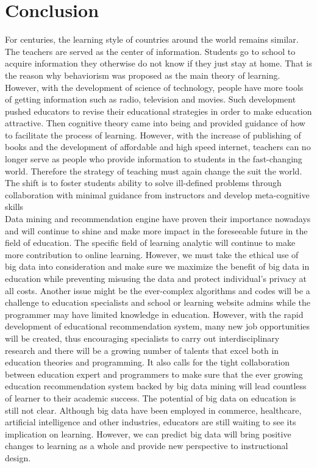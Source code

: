 \documentclass[sigconf]{acmart}
\begin{document}
\section{Conclusion}
For centuries, the learning style of countries around the world remains similar. The teachers are served as the center of information. Students go to school to acquire information they otherwise do not know if they just stay at home. That is the reason why behaviorism was proposed as the main theory of learning. However, with the development of science of technology, people have more tools of getting information such as radio, television and movies. Such development pushed educators to revise their educational strategies in order to make education attractive. Then cognitive theory came into being and provided guidance of how to facilitate the process of learning. However, with the increase of publishing of books and the development of affordable and high speed internet, teachers can no longer serve as people who provide information to students in the fast-changing world. Therefore the strategy of teaching must again change the suit the world. The shift is to foster students ability to solve ill-defined problems through collaboration with minimal guidance from instructors and develop meta-cognitive skills\\
Data mining and recommendation engine have proven their importance nowadays and will continue to shine and make more impact in the foreseeable future in the field of education. The specific field of learning analytic will continue to make more contribution to online learning. However, we must take the ethical use of big data into consideration and make sure we maximize the benefit of big data in education while preventing misusing the data and protect individual's privacy at all costs. Another issue might be the ever-complex algorithms and codes will be a challenge to education specialists and school or learning website admins while the programmer may have limited knowledge in education. However, with the rapid development of educational recommendation system, many new job opportunities will be created, thus encouraging specialists to carry out interdisciplinary research and there will be a growing number of talents that excel both in education theories and programming. It also calls for the tight collaboration between education expert and programmers to make sure that the ever growing education recommendation system backed by big data mining will lead countless of learner to their academic success. The potential of big data on education is still not clear. Although big data have been employed in commerce, healthcare, artificial intelligence and other industries, educators are still waiting to see its implication on learning. However, we can predict big data will bring positive changes to learning as a whole and provide new perspective to instructional design.
\end{document}
